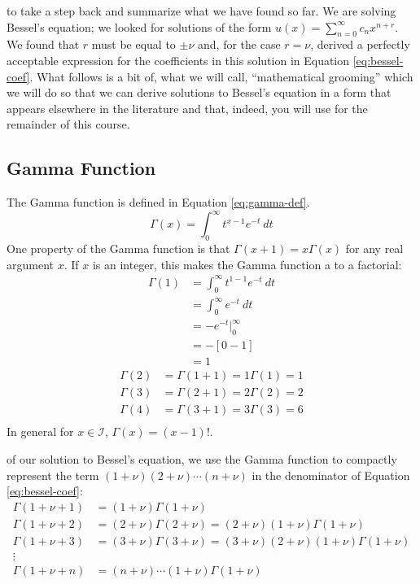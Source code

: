  to take a step back and summarize what we have found so far.  We are solving Bessel's equation; we looked for solutions of the form $u(x)=\sum_{n=0}^{\infty} c_n x^{n+r}$.  We found that $r$ must be equal to $\pm \nu$ and, for the case $r = \nu$, derived a perfectly acceptable expression for the coefficients in this solution in Equation \ref{eq:bessel-coef}. What follows is a bit of, what we will call, ``mathematical grooming'' which we will do so that we can derive solutions to Bessel's equation in a form that appears elsewhere in the literature and that, indeed, you will use for the remainder of this course.
\subsection{Gamma Function}
The Gamma function is defined in Equation \ref{eq:gamma-def}.
\begin{equation}
\Gamma(x) = \int_0^{\infty} t^{x-1}e^{-t} \ dt
\label{eq:gamma-def}
\end{equation}
One property of the Gamma function is that $\Gamma(x+1) = x \Gamma(x)$ for any real argument $x$. If $x$ is an integer, this makes the Gamma function a to a factorial: 
\begin{align*}
\Gamma(1) &= \int_0^{\infty}t^{1-1} e^{-t} \ dt \\
&= \int_0^{\infty}e^{-t} \ dt \\
&= -e^{-t}\Bigr|_0^{\infty} \\
&= -[0 - 1] \\
&= 1
\end{align*}
\begin{align*}
\Gamma(2) &= \Gamma(1+1) = 1\Gamma(1) = 1 \\
\Gamma(3) &= \Gamma(2+1) = 2\Gamma(2) = 2 \\
\Gamma(4) &= \Gamma(3+1) = 3\Gamma(3) = 6 \\
\end{align*}
In general for $x \in \mathcal{I}$, $\Gamma(x) = (x-1)!$. 

 of our solution to Bessel's equation, we use the Gamma function to compactly represent the term $(1+\nu)(2+\nu)\cdots(n+\nu)$ in the denominator of Equation \ref{eq:bessel-coef}:
\begin{align*}
\Gamma(1+\nu+1) &= (1+\nu)\Gamma(1+\nu) \\
\Gamma(1+\nu+2) &= (2+\nu)\Gamma(2+\nu) = (2+\nu)(1+\nu)\Gamma(1+\nu) \\
\Gamma(1+\nu+3) &= (3+\nu)\Gamma(3+\nu) = (3+\nu)(2+\nu)(1+\nu)\Gamma(1+\nu) \\
\vdots \\
\Gamma(1+\nu+n) &= (n+\nu)\cdots(1+\nu)\Gamma(1+\nu)
\end{align*}

